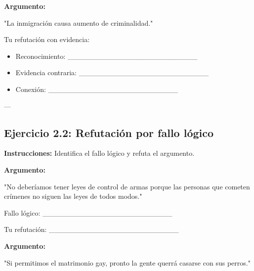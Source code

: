 \documentclass[a4paper,11pt]{article}
\begin{document}
\vspace{0.2cm}

\textbf{Argumento:}

"La inmigración causa aumento de criminalidad."

\vspace{0.2cm}

Tu refutación con evidencia:

\begin{itemize}

  \item Reconocimiento: _________________________

  \item Evidencia contraria: _________________________

  \item Conexión: _________________________

\end{itemize}

\vspace{0.2cm}

---

\vspace{0.2cm}

\subsection{Ejercicio 2.2: Refutación por fallo lógico}

\vspace{0.2cm}

\textbf{Instrucciones:} Identifica el fallo lógico y refuta el argumento.

\vspace{0.2cm}

\textbf{Argumento:}

"No deberíamos tener leyes de control de armas porque las personas que cometen crímenes no siguen las leyes de todos modos."

\vspace{0.2cm}

Fallo lógico: _________________________

\vspace{0.2cm}

Tu refutación: _________________________

\vspace{0.2cm}

\textbf{Argumento:}

"Si permitimos el matrimonio gay, pronto la gente querrá casarse con sus perros."
\end{document}
